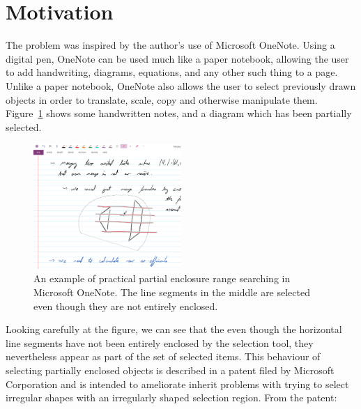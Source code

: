 \section{Motivation}
\label{:intro:motivation}

The problem was inspired by the author's use of Microsoft OneNote. 
Using a digital pen, OneNote can be used much like a paper notebook, allowing the user to add handwriting, diagrams, equations, and any other such thing to a page.
Unlike a paper notebook, OneNote also allows the user to select previously drawn objects in order to translate, scale, copy and otherwise manipulate them.
Figure~\ref{fig:intro:onenote} shows some handwritten notes, and a diagram which has been partially selected.

\begin{figure}
\begin{center}
  \includegraphics[width=0.50\textwidth]{figures/fig_onenote}
  \caption[An example of practical partial enclosure range searching]{An example of practical partial enclosure range searching in Microsoft OneNote. The line segments in the middle are selected even though they are not entirely enclosed.}
  \label{fig:intro:onenote}
\end{center}
\end{figure}

Looking carefully at the figure, we can see that the even though the horizontal line segments have not been entirely enclosed by the selection tool, they nevertheless appear as part of the set of selected items.
This behaviour of selecting partially enclosed objects is described in a patent filed by Microsoft Corporation\cite{lassoselect} and is intended to ameliorate inherit problems with trying to select irregular shapes with an irregularly shaped selection region. 
From the patent:

